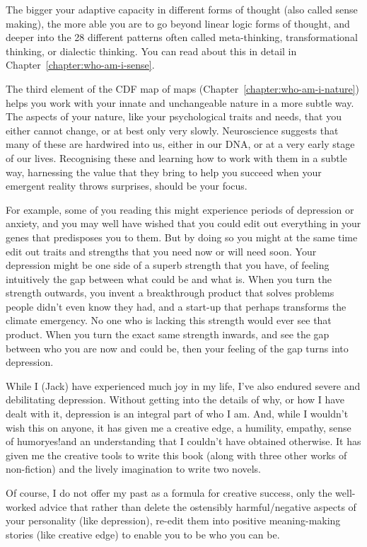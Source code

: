 The bigger your adaptive capacity in different forms of thought (also called sense making), the more able you are to go beyond linear logic forms of thought, and deeper into the 28 different patterns often called meta-thinking, transformational thinking, or dialectic thinking. You can read about this in detail in Chapter~\ref{chapter:who-am-i-sense}.


The third element of the CDF map of maps (Chapter~\ref{chapter:who-am-i-nature}) helps you work with your innate and unchangeable nature in a more subtle way. The aspects of your nature, like your psychological traits and needs, that you either cannot change, or at best only very slowly. Neuroscience suggests that many of these are hardwired into us, either in our DNA, or at a very early stage of our lives. Recognising these and learning how to work with them in a subtle way, harnessing the value that they bring to help you succeed when your emergent reality throws surprises, should be your focus. 


For example, some of you reading this might experience periods of depression or anxiety, and you may well have wished that you could edit out everything in your genes that predisposes you to them. But by doing so you might at the same time edit out traits and strengths that you need now or will need soon. Your depression might be one side of a superb strength that you have, of feeling intuitively the gap between what could be and what is. When you turn the strength outwards, you invent a breakthrough product that solves problems people didn't even know they had, and a start-up that perhaps transforms the climate emergency. No one who is lacking this strength would ever see that product. When you turn the exact same strength inwards, and see the gap between who you are now and could be, then your feeling of the gap turns into depression.


\begin{longstoryblock}
While I (Jack) have experienced much joy in my life, I’ve also endured severe and debilitating depression. Without getting into the details of why, or how I have dealt with it, depression is an integral part of who I am. And, while I wouldn’t wish this on anyone, it has given me a creative edge, a humility, empathy, sense of humor\textemdash yes!\textemdash and an understanding that I couldn’t have obtained otherwise. It has given me the creative tools to write this book (along with three other works of non-fiction) and the lively imagination to write two novels. 


Of course, I do not offer my past as a formula for creative success, only the well-worked advice that rather than delete the ostensibly harmful/negative aspects of your personality (like depression), re-edit them into positive meaning\hyp{}making stories (like creative edge) to enable you to be who you can be.   
\end{longstoryblock}


